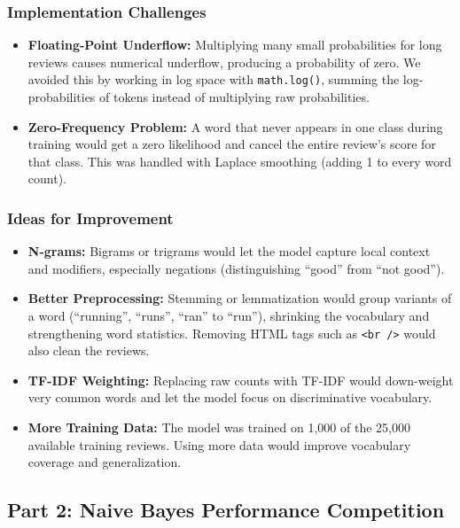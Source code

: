 \documentclass[sigconf]{acmart}
\begin{document}
\subsubsection{Implementation Challenges}
\begin{itemize}
    \item \textbf{Floating-Point Underflow:} Multiplying many small probabilities for long reviews causes numerical underflow, producing a probability of zero. We avoided this by working in log space with \texttt{math.log()}, summing the log-probabilities of tokens instead of multiplying raw probabilities.
    \item \textbf{Zero-Frequency Problem:} A word that never appears in one class during training would get a zero likelihood and cancel the entire review's score for that class. This was handled with Laplace smoothing (adding 1 to every word count).
\end{itemize}

\subsubsection{Ideas for Improvement}
\begin{itemize}
    \item \textbf{N-grams:} Bigrams or trigrams would let the model capture local context and modifiers, especially negations (distinguishing ``good'' from ``not good'').
    \item \textbf{Better Preprocessing:} Stemming or lemmatization would group variants of a word (``running'', ``runs'', ``ran'' to ``run''), shrinking the vocabulary and strengthening word statistics. Removing HTML tags such as \texttt{<br />} would also clean the reviews.
    \item \textbf{TF-IDF Weighting:} Replacing raw counts with TF-IDF would down-weight very common words and let the model focus on discriminative vocabulary.
    \item \textbf{More Training Data:} The model was trained on 1,000 of the 25,000 available training reviews. Using more data would improve vocabulary coverage and generalization.
\end{itemize}

\subsection{Part 2: Naive Bayes Performance Competition}
\end{document}
